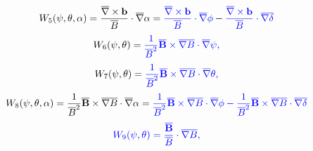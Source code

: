 \documentclass{article}
\newcommand{\tmcolor}[2]{{\color{#1}{#2}}}
\begin{document}
\begin{equation}
  W_5 (\psi, \theta, \alpha) = \frac{\overline{\nabla} \times
  \mathbf{b}}{\overline{B}} \cdot \overline{\nabla} \alpha =
  \tmcolor{blue}{\frac{\overline{\nabla} \times \mathbf{b}}{\overline{B}}
  \cdot \overline{\nabla} \phi} - \tmcolor{blue}{\frac{\overline{\nabla}
  \times \mathbf{b}}{\overline{B}} \cdot \overline{\nabla} \overline{\delta}}
\end{equation}
\begin{equation}
  W_6 (\psi, \theta) = \tmcolor{blue}{\frac{1}{\overline{B}^2}
  \overline{\mathbf{B}} \times \overline{\nabla} \overline{B} \cdot
  \overline{\nabla} \psi,}
\end{equation}
\begin{equation}
  W_7 (\psi, \theta) = \tmcolor{blue}{\frac{1}{\overline{B}^2}
  \overline{\mathbf{B}} \times \overline{\nabla} \overline{B} \cdot
  \overline{\nabla} \theta,}
\end{equation}
\begin{equation}
  W_8 (\psi, \theta, \alpha) = \frac{1}{\overline{B}^2} \overline{\mathbf{B}}
  \times \overline{\nabla} \overline{B} \cdot \overline{\nabla} \alpha =
  \tmcolor{blue}{\frac{1}{\overline{B}^2} \overline{\mathbf{B}} \times
  \overline{\nabla} \overline{B} \cdot \overline{\nabla} \phi -
  \frac{1}{\overline{B}^2} \overline{\mathbf{B}} \times \overline{\nabla}
  \overline{B} \cdot \overline{\nabla} \overline{\delta}}
\end{equation}
\begin{equation}
  \tmcolor{blue}{W_9 (\psi, \theta) =
  \frac{\overline{\mathbf{B}}}{\overline{B}} \cdot \overline{\nabla}
  \overline{B},}
\end{equation}
\end{document}
